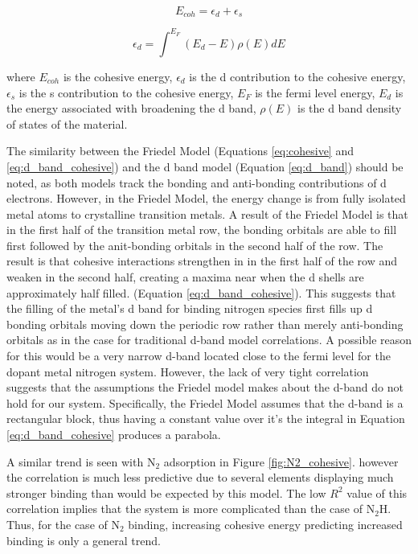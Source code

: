 \begin{equation}
    E_{coh} = \epsilon_d + \epsilon_s
    \label{eq:cohesive}
\end{equation}

\begin{equation}
    \epsilon_d = \int^{E_F} (E_d-E)\rho(E)dE
    \label{eq:d_band_cohesive}
\end{equation}

where $E_{coh}$ is the cohesive energy, $\epsilon_d$ is the d contribution to the cohesive energy, $\epsilon_s$ is the s contribution to the cohesive energy, $E_F$ is the fermi level energy, $E_d$ is the energy associated with broadening the d band, $\rho(E)$ is the d band density of states of the material. 

The similarity between the Friedel Model (Equations \ref{eq:cohesive} and \ref{eq:d_band_cohesive}) and the d band model (Equation \ref{eq:d_band}) should be noted, as both models track the bonding and anti-bonding contributions of d electrons. However, in the Friedel Model, the energy change is from fully isolated metal atoms to crystalline transition metals. A result of the Friedel Model is that in the first half of the transition metal row, the bonding orbitals are able to fill first followed by the anit-bonding orbitals in the second half of the row. The result is that cohesive interactions strengthen in in the first half of the row and weaken in the second half, creating a maxima near when the d shells are approximately half filled. (Equation \ref{eq:d_band_cohesive}). This suggests that the filling of the metal's d band for binding nitrogen species first fills up d bonding orbitals moving down the periodic row rather than merely anti-bonding orbitals as in the case for traditional d-band model correlations. A possible reason for this would be a very narrow d-band located close to the fermi level for the dopant metal nitrogen system. However, the lack of very tight correlation suggests that the assumptions the Friedel model makes about the d-band do not hold for our system. Specifically, the Friedel Model assumes that the d-band is a rectangular block, thus having a constant value over it's  the integral in Equation \ref{eq:d_band_cohesive} produces a parabola.



A similar trend is seen with N$_2$ adsorption in Figure \ref{fig:N2_cohesive}. however the correlation is much less predictive due to several elements displaying much stronger binding than would be expected by this model. The low $R^2$ value of this correlation implies that the system is more complicated than the case of N$_2$H. Thus, for the case of N$_2$ binding, increasing cohesive energy predicting increased binding is only a general trend. 

